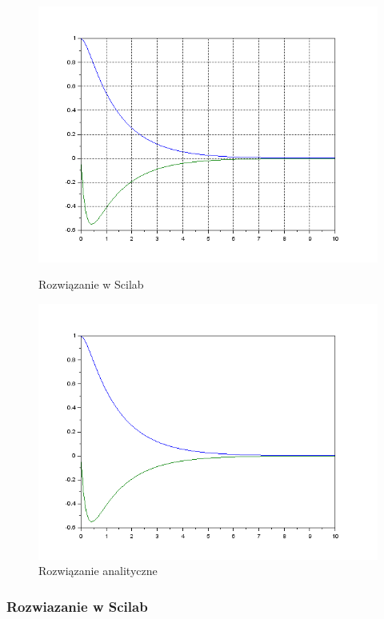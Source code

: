 \documentclass[12pt]{article}
\begin{document}
\begin{figure}[H]
  \centering
  \hspace{-1.6cm}
  \begin{minipage}[b]{0.49\textwidth}
    \includegraphics[scale=0.47]{./img/4-rzeczywiste-xy}
    \caption{Rozwiązanie w Scilab}
    \end{minipage}
  \hfill
  \begin{minipage}[b]{0.49\textwidth}
    \includegraphics[scale=0.47]{./img/4-analityczne}
    \caption{Rozwiązanie analityczne}
    \label{4-analityczne}
  \end{minipage}
\end{figure}

\subsubsection{Rozwiazanie w Scilab}
\end{document}
